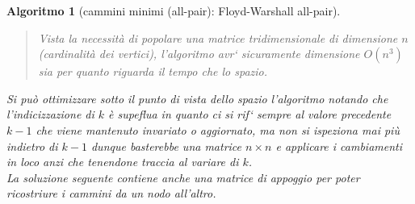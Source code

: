 \documentclass[oneside]{book}
\newtheorem{alg}{Algoritmo}
\begin{document}
\begin{alg}[cammini minimi (all-pair): Floyd-Warshall all-pair]
  \begin{algorithm}[H]
  \end{algorithm}
  \begin{quote}
    Vista la necessit\`a di popolare una matrice tridimensionale di dimensione
    $n$ (cardinalit\`a dei vertici), l'algoritmo avr\a` sicuramente dimensione
    $O(n^3)$ sia per quanto riguarda il tempo che lo spazio.
  \end{quote}
  Si pu\`o ottimizzare sotto il punto di vista dello spazio l'algoritmo notando che
  l'indicizzazione di $k$ \`e supeflua in quanto ci si rif\a` sempre al valore
  precedente $k-1$ che viene mantenuto invariato o aggiornato, ma non si ispeziona
  mai pi\`u indietro di $k-1$ dunque basterebbe una matrice $n \times n$ e applicare
  i cambiamenti in loco anzi che tenendone traccia al variare di $k$. \\
  La soluzione seguente contiene anche una matrice di appoggio per poter
  ricostriure i cammini da un nodo all'altro.


\end{alg}
\end{document}
